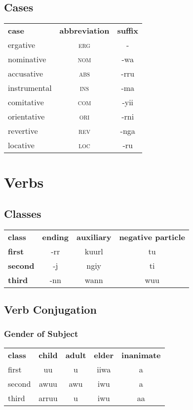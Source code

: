 \documentclass{article}
\begin{document}
\begin{multicols*}{3}
\subsection{Cases}
\begin{tabular}{lcc}
\textbf{case} & \textbf{abbreviation} & \textbf{suffix}\\
ergative & \textsc{erg} & -\\
nominative & \textsc{nom} & -wa\\
accusative & \textsc{abs} & -rru\\
instrumental & \textsc{ins} & -ma\\
comitative & \textsc{com} & -yii\\
orientative & \textsc{ori} & -rni\\
revertive & \textsc{rev} & -nga\\
locative & \textsc{loc} & -ru\\
\end{tabular}

\section{Verbs}

\subsection{Classes}

\begin{tabular}{lccc}
\textbf{class} & \textbf{ending} & \textbf{auxiliary} & \textbf{negative particle}\\
\textbf{first} & -rr & kuurl & tu\\
\textbf{second} & -j & ngiy & ti\\
\textbf{third} & -nn & wann & wuu\\
\end{tabular}

\subsection{Verb Conjugation}

\subsubsection{Gender of Subject}
\begin{tabular}{lcccc}
\textbf{class} & \textbf{child} & \textbf{adult} & \textbf{elder} & \textbf{inanimate}\\
first & uu & u & iiwa & a\\
second & awuu & awu & iwu & a\\
third & arruu & u & iwu & aa\\
\end{tabular}


\end{multicols*}
\end{document}
